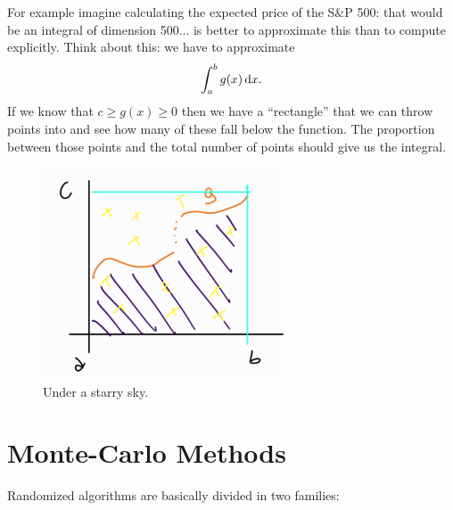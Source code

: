 \documentclass[12pt]{report}
\begin{document}
For example imagine calculating the expected price of the S\&P 500: that would be an integral of dimension 500... is better to approximate this than to compute explicitly.
Think about this: we have to approximate
	\begin{equation*}
		\int_{a}^{b}g(x)\mathop{}\!\mathrm{d} x.
	\end{equation*}
	If we know that $c\geq g(x)\geq0$ then we have a ``rectangle'' that we can throw points into and see how many of these fall below the function. The proportion between those points and the total number of points should give us the integral.
	\begin{figure}[H]
		\centering
		\includegraphics[width=0.55\linewidth]{img/screenshot063}
		\caption{Under a starry sky.}
		\label{fig:screenshot063}
	\end{figure}
\section{Monte-Carlo Methods}
Randomized algorithms are basically divided in two families: 
\listoffigures  
\end{document}
